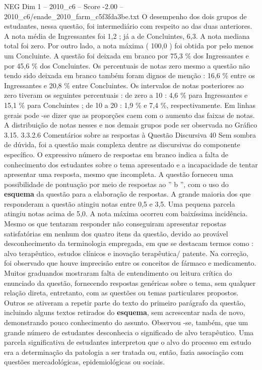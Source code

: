 \begin{textsample}{NEG Dim 1 – 2010\_c6 – Score -2.00 – 2010\_c6/enade\_2010\_farm\_c5f3fda3be.txt}
O desempenho dos dois grupos de estudantes, nessa questão, foi intermediário com respeito ao das duas anteriores.
A nota média de Ingressantes foi 1,2 ; já a de Concluintes, 6,3.
A nota mediana total foi zero.
Por outro lado, a nota máxima ( 100,0 ) foi obtida por pelo menos um Concluinte.
A questão foi deixada em branco por 75,3 \% dos Ingressantes e por 45,6 \% dos Concluintes.
Os percentuais de notas zero mesmo a questão não tendo sido deixada em branco também foram dignos de menção : 16,6 \% entre os Ingressantes e 20,8 \% entre Concluintes.
Os intervalos de notas posteriores ao zero tiveram os seguintes percentuais : de zero a 10 : 4,6 \% para Ingressantes e 15,1 \% para Concluintes ; de 10 a 20 : 1,9 \% e 7,4 \%, respectivamente.
Em linhas gerais pode -se dizer que as proporções caem com o aumento das faixas de notas.
A distribuição de notas nesses e nos demais grupos pode ser observada no Gráfico 3.15. 3.3.2.6 Comentários sobre as respostas à Questão Discursiva 40 Sem sombra de dúvida, foi a questão mais complexa dentre as discursivas do componente específico.
O expressivo número de respostas em branco indica a falta de conhecimento dos estudantes sobre o tema apresentado e a incapacidade de tentar apresentar uma resposta, mesmo que incompleta.
A questão forneceu uma possibilidade de pontuação por meio de respostas ao ” b ”, com o uso do \textbf{esquema} da questão para a elaboração de respostas.
A grande maioria dos que responderam a questão atingiu notas entre 0,5 e 3,5.
Uma pequena parcela atingiu notas acima de 5,0.
A nota máxima ocorreu com baixíssima incidência.
Mesmo os que tentaram responder não conseguiram apresentar repostas satisfatórias em nenhum dos quatro itens da questão, devido ao provável desconhecimento da terminologia empregada, em que se destacam termos como : alvo terapêutico, estudos clínicos e inovação terapêutica/ patente.
Na correção, foi observado que houve imprecisão entre os conceitos de fármaco e medicamento.
Muitos graduandos mostraram falta de entendimento ou leitura crítica do enunciado da questão, fornecendo respostas genéricas sobre o tema, sem qualquer relação direta, entretanto, com as questões ou temas particulares propostos.
Outros se ativeram a repetir parte do texto do primeiro parágrafo da questão, incluindo alguns textos retirados do \textbf{esquema}, sem acrescentar nada de novo, demonstrando pouco conhecimento do assunto.
Observou -se, também, que um grande número de estudantes desconhecia o significado de alvo terapêutico.
Uma parcela significativa de estudantes interpretou que o alvo do processo em estudo era a determinação da patologia a ser tratada ou, então, fazia associação com questões mercadológicas, epidemiológicas ou sociais.

\end{textsample}
